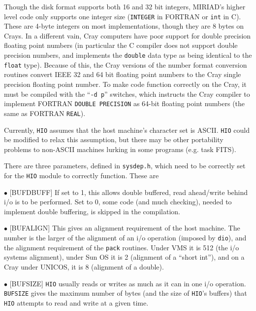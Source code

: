 Though the disk format supports both 16 and 32 bit integers, MIRIAD's
higher level code only supports one integer size ({\tt INTEGER} in FORTRAN
or {\tt int} in C). These are 4-byte integers on most implementations, though
they are 8 bytes on Crays. In a different vain, Cray computers have poor
support for double precision floating point numbers (in particular the
C compiler does not support double precision numbers, and implements the
{\tt double} data type as being identical to the {\tt float} type).
Because of this, the Cray versions of the number format conversion routines
convert IEEE 32 and 64 bit floating point numbers to the Cray single
precision floating point number. To make code function correctly on the
Cray, it must be compiled with the ``{\tt -d p}'' switches, which instructs
the Cray compiler to implement FORTRAN {\tt DOUBLE PRECISION} as 64-bit
floating point numbers (the same as FORTRAN {\tt REAL}).

Currently, {\tt HIO} assumes that the host machine's character set is ASCII.
{\tt HIO} could be modified to relax this assumption, but there may be
other portability problems to non-ASCII machines lurking in some programs
(e.g. task FITS).


There are three parameters, defined in {\tt sysdep.h}, which need to
be correctly set for the {\tt HIO} module to correctly function. These
are

\item{$\bullet$} [BUFDBUFF] If set to 1, this allows double buffered,
read ahead/write behind i/o is to be performed. Set to 0, some code
(and much checking), needed to implement double buffering, is skipped in
the compilation.
\item{$\bullet$} [BUFALIGN] This gives an alignment requirement of the
host machine.  The number is the larger of the alignment of an i/o
operation (imposed by {\tt dio}), and the alignment requirement of the
{\tt pack} routines. Under VMS it is 512 (the i/o systems alignment),
under Sun OS it is 2 (alignment of a ``short int''), and on a Cray
under UNICOS, it is 8 (alignment of a double).
\item{$\bullet$} [BUFSIZE] {\tt HIO} usually reads or writes as much as
it can in one i/o operation. {\tt BUFSIZE} gives the maximum number of
bytes (and the size of {\tt HIO}'s buffers) that {\tt HIO} attempts to
read and write at a given time.



